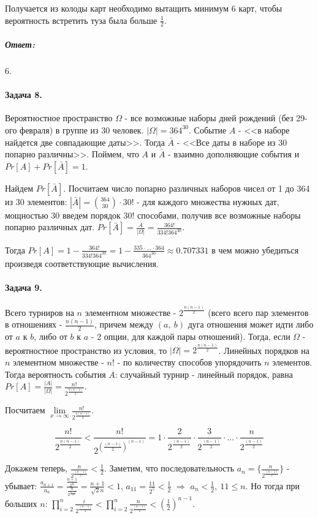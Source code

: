 \documentclass{article}
\newcommand{\pair}[2]{(#1,\ #2)}
\newcommand{\half}[1]{\frac{#1}{2}}
\begin{document}
	Получается из колоды карт необходимо вытащить минимум 6 карт, чтобы вероятность встретить туза была больше $\frac{1}{2}$.
	\subparagraph{Ответ:} 6.
	
	\paragraph{Задача 8.}
	Вероятностное пространство $\Omega$ - все возможные наборы дней рождений (без 29-ого февраля) в группе из 30 человек. $|\Omega| = 364^{30}$. Событие $A$ - <<в наборе найдется две совпадающие даты>>. Тогда $\bar{A}$ - <<Все даты в наборе из 30 попарно различны>>. Поймем, что $A$ и $\bar{A}$ - взаимно дополняющие события и $Pr[A] + Pr[\bar{A}] = 1$.
	
	Найдем $Pr[\bar{A}]$. Посчитаем число попарно различных наборов чисел от 1 до 364 из 30 элементов: $|\bar{A}| = {364 \choose 30} \cdot 30!$ - для каждого множества нужных дат, мощностью 30 введем порядок $30!$ способами, получив все возможные наборы попарно различных дат. $Pr[\bar{A}] = \frac{\bar{A}}{|\Omega|} = \frac{364!}{334!364^{30}}$.
	
	Тогда $Pr[A] = 1 - \frac{364!}{334!364^{30}} = 1 - \frac{335 \cdot ... \cdot 364} {364^{30}} \approx 0.707331$ в чем можно убедиться произведя соответствующие вычисления.
	
	\paragraph{Задача 9.}
	Всего турниров на $n$ элементном множестве - $2^{\half{n(n - 1)}}$ (всего всего пар элементов в отношениях - $\half{n(n - 1)}$, причем между $\pair{a}{b}$ дуга отношения может идти либо от $a$ к $b$, либо от $b$ к $a$ - 2 опции, для каждой пары отношений). Тогда, если $\Omega$ - вероятностное пространство из условия, то $|\Omega| = 2^{\half{n(n - 1)}} $. Линейных порядков на $n$ элементном множестве - $n!$ - по количеству способов упорядочить $n$ элементов. Тогда вероятность события $A$: случайный турнир - линейный порядок, равна $Pr[A] = \frac{|A|}{|\Omega|} = \frac{n!}{2^{\half{n(n - 1)}}}$.
	
	Посчитаем $\lim\limits_{x \rightarrow \infty} \frac{n!}{2^{\half{n(n - 1)}}}$.
	
	$$\frac{n!}{2^{\half{n(n - 1)}}} < \frac{n!}{2^{(\half{(n - 1)}) ^ {(n - 1)}}} = 1 \cdot \frac {2}{2^{\half{(n - 1)}}} \cdot \frac {3}{2^{\half{(n - 1)}}} \cdot ... \cdot \frac{n} {2^{\half{(n - 1)}}}$$

	Докажем теперь, $\frac{n} {2^{\half{(n - 1)}}} < \half{1}$. 
	Заметим, что последовательность $a_n = \{\frac{n} {2^{\half{(n - 1)}}} \}$ - убывает: $\frac{a_{n + 1}}{a_n} = \frac{\frac{n + 1} {2^{\half{n} } } } {\frac{n} {2^{\half{n - 1} } } } = \frac{n + 1}{\sqrt{2}n} < 1$, $a_{11} = \frac{11} {2^{5}} < \half{1}$ $\Rightarrow$ $a_n < \half{1},\ 11 \leqslant n$. Но тогда при больших $n$: $\prod_{i=2}^{n} \frac {i}{2^{\half{(n - 1)}}} < \prod_{i=2}^{n} \frac {n}{2^{\half{(n - 1)}}} < (\half{1})^{n - 1}$.
	
\end{document}
